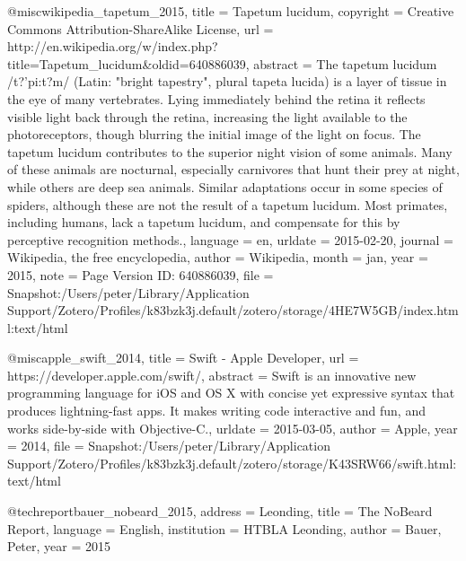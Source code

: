 {@misc{wikipedia_tapetum_2015,
	title = {Tapetum lucidum},
	copyright = {Creative Commons Attribution-ShareAlike License},
	url = {http://en.wikipedia.org/w/index.php?title=Tapetum_lucidum&oldid=640886039},
	abstract = {The tapetum lucidum /t?'pi:t?m/ (Latin: "bright tapestry", plural tapeta lucida) is a layer of tissue in the eye of many vertebrates. Lying immediately behind the retina it reflects visible light back through the retina, increasing the light available to the photoreceptors, though blurring the initial image of the light on focus. The tapetum lucidum contributes to the superior night vision of some animals. Many of these animals are nocturnal, especially carnivores that hunt their prey at night, while others are deep sea animals.
Similar adaptations occur in some species of spiders, although these are not the result of a tapetum lucidum. Most primates, including humans, lack a tapetum lucidum, and compensate for this by perceptive recognition methods.},
	language = {en},
	urldate = {2015-02-20},
	journal = {Wikipedia, the free encyclopedia},
	author = {{Wikipedia}},
	month = jan,
	year = {2015},
	note = {Page Version ID: 640886039},
	file = {Snapshot:/Users/peter/Library/Application Support/Zotero/Profiles/k83bzk3j.default/zotero/storage/4HE7W5GB/index.html:text/html}
}

@misc{apple_swift_2014,
	title = {Swift - {Apple} {Developer}},
	url = {https://developer.apple.com/swift/},
	abstract = {Swift is an innovative new programming language for iOS and OS X with concise yet expressive syntax that produces lightning-fast apps. It makes writing code interactive and fun, and works side-by-side with Objective-C.},
	urldate = {2015-03-05},
	author = {Apple},
	year = {2014},
	file = {Snapshot:/Users/peter/Library/Application Support/Zotero/Profiles/k83bzk3j.default/zotero/storage/K43SRW66/swift.html:text/html}
}

@techreport{bauer_nobeard_2015,
	address = {Leonding},
	title = {The {NoBeard} {Report}},
	language = {English},
	institution = {HTBLA Leonding},
	author = {Bauer, Peter},
	year = {2015}
}

}
